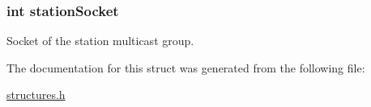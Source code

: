\subsubsection[{\texorpdfstring{station\+Socket}{stationSocket}}]{\setlength{\rightskip}{0pt plus 5cm}int station\+Socket}\hypertarget{struct_m_c_m__server_stats_a67066952f338a9b037e27997855a456b}{}\label{struct_m_c_m__server_stats_a67066952f338a9b037e27997855a456b}


Socket of the station multicast group. 



The documentation for this struct was generated from the following file\+:\begin{DoxyCompactItemize}
\item 
\hyperlink{structures_8h}{structures.\+h}\end{DoxyCompactItemize}
